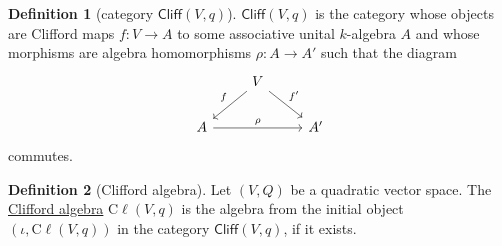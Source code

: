 \documentclass[a4paper,10pt]{scrreprt}
\newcommand{\defn}[1]{\ul{#1}}
\newcommand{\cliff}{\mathrm{C}\ell}
\theoremstyle{definition}
\newtheorem{definition}{Definition}[section]
\theoremstyle{plain}
\theoremstyle{remark}
\begin{document}
\begin{definition}[category $\mathsf{Cliff}(V,q)$]
  \label{def:cliffordcategory}
  $\mathsf{Cliff}(V,q)$ is the category whose objects are Clifford maps $f\colon V \to A$ to some associative unital $k$-algebra $A$ and whose morphisms are algebra homomorphisms $\rho\colon A \to A'$ such that the diagram
  \begin{equation*}
    \begin{tikzcd}
      & V \arrow[dl, swap, "f"] \arrow[dr, "f'"] & \\
      A \arrow[rr, "\rho"] & & A'
    \end{tikzcd}
  \end{equation*}
  commutes.
\end{definition}

\begin{definition}[Clifford algebra]
  \label{def:cliffordalgebra}
  Let $(V,Q)$ be a quadratic vector space. The \defn{Clifford algebra} $\cliff(V,q)$ is the algebra from the initial object $(\iota, \cliff(V,q))$ in the category $\mathsf{Cliff}(V,q)$, if it exists.
\end{definition}
\end{document}
